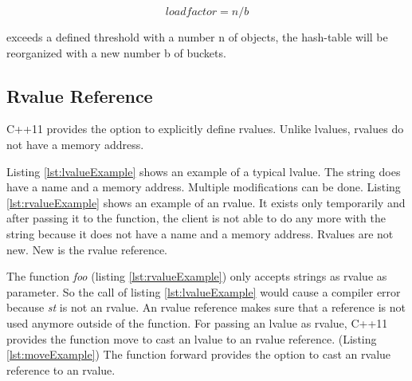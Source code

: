 {\begin{equation}
  loadfactor = n / b
  \label{eq:loadfactor}
\end{equation}

\noindent exceeds a defined threshold with a number n of objects, the hash-table will be reorganized with a new number b of buckets. \cite[cf.][828 - 829]{Kirch2015}

\FloatBarrier

\subsection{Rvalue Reference}\label{sec:rvalueReference}
C++11 provides the option to explicitly define rvalues. Unlike lvalues, rvalues do not have a memory address. 



 

\noindent Listing \ref{lst:lvalueExample} shows an example of a typical lvalue. The string does have a name and a memory address. Multiple modifications can be done. Listing \ref{lst:rvalueExample} shows an example of an rvalue. It exists only temporarily and after passing it to the function, the client is not able to do any more with the string because it does not have a name and a memory address. Rvalues are not new. New is the rvalue reference. 

 

\noindent The function \emph{foo} (listing \ref{lst:rvalueExample}) only accepts strings as rvalue as parameter. So the call of listing \ref{lst:lvalueExample} would cause a compiler error because \emph{st} is not an rvalue. An rvalue reference makes sure that a reference is not used anymore outside of the function. \cite[cf.][32 - 33]{Pohmann2013} For passing an lvalue as rvalue, C++11 provides the function move to cast an lvalue to an rvalue reference. (Listing \ref{lst:moveExample}) The function forward provides the option to cast an rvalue reference to an rvalue.

}
